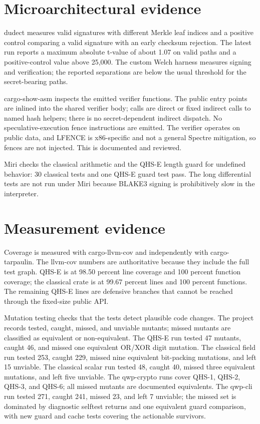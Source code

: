\documentclass[11pt,a4paper]{article}
\theoremstyle{remark}
\begin{document}
\section{Microarchitectural evidence}

dudect measures valid signatures with different Merkle leaf indices and a
positive control comparing a valid signature with an early checksum rejection.
The latest run reports a maximum absolute t-value of about 1.07 on valid paths
and a positive-control value above 25,000. The custom Welch harness measures
signing and verification; the reported separations are below the usual
threshold for the secret-bearing paths.

cargo-show-asm inspects the emitted verifier functions. The public entry points
are inlined into the shared verifier body; calls are direct or fixed indirect
calls to named hash helpers; there is no secret-dependent indirect dispatch.
No speculative-execution fence instructions are emitted. The verifier operates
on public data, and LFENCE is x86-specific and not a general Spectre mitigation,
so fences are not injected. This is documented and reviewed.

Miri checks the classical arithmetic and the QHS-E length guard for undefined
behavior: 30 classical tests and one QHS-E guard test pass. The long
differential tests are not run under Miri because BLAKE3 signing is prohibitively
slow in the interpreter.

\section{Measurement evidence}

Coverage is measured with cargo-llvm-cov and independently with
cargo-tarpaulin. The llvm-cov numbers are authoritative because they include the
full test graph. QHS-E is at 98.50 percent line coverage and 100 percent function
coverage; the classical crate is at 99.67 percent lines and 100 percent
functions. The remaining QHS-E lines are defensive branches that cannot be
reached through the fixed-size public API.

Mutation testing checks that the tests detect plausible code changes. The
project records tested, caught, missed, and unviable mutants; missed mutants are
classified as equivalent or non-equivalent. The QHS-E run tested 47 mutants,
caught 46, and missed one equivalent OR/XOR digit mutation. The classical field
run tested 253, caught 229, missed nine equivalent bit-packing mutations, and
left 15 unviable. The classical scalar run tested 48, caught 40, missed three
equivalent mutations, and left five unviable. The qwp-crypto runs cover QHS-1,
QHS-2, QHS-3, and QHS-6; all missed mutants are documented equivalents. The
qwp-cli run tested 271, caught 241, missed 23, and left 7 unviable; the missed
set is dominated by diagnostic selftest returns and one equivalent guard
comparison, with new guard and cache tests covering the actionable survivors.
\end{document}
